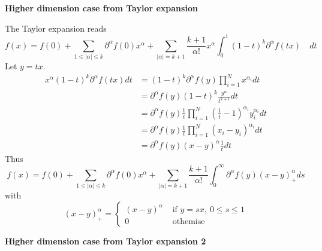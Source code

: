 \noindent\textbf{Higher dimension case from Taylor expansion}

The Taylor expansion reads
\begin{equation}
f(x)=f(0)+\sum_{1\le |\alpha| \leqslant k} \partial^\alpha f(0) x^{\alpha}+\sum_{|\alpha|=k+1} \frac{k+1}{\alpha !} x^{\alpha} \int_{0}^{1}(1-t)^{k} \partial^\alpha f(t x) \quad d t
\end{equation}
Let $y=tx$.
\begin{equation}
\begin{aligned}
x^{\alpha}(1-t)^{k} \partial^{\alpha} f(t x) d t &=(1-t)^{k} \partial^{\alpha} f(y) \prod_{i=1}^{N} x^{\alpha_{i}} d t\\
&=\partial^{\alpha} f(y) (1-t)^{k} \frac{y^{\alpha}}{t^{k+1}} d t \\
&=\partial^{\alpha} f(y)  \frac{1}{t} \prod_{i=1}^{N}\left(\frac{1}{t}-1\right)^{\alpha_{i}} y_{i}^{\alpha_{i}} d t \\
&=\partial^{\alpha} f(y)  \frac{1}{t} \prod_{i=1}^{N}\left(x_{i}-y_{i}\right)^{\alpha_{i}} d t \\
&=\partial^{\alpha} f(y)  (x-y)^{\alpha} \frac{1}{t} d t
\end{aligned}
\end{equation}
Thus 
\begin{equation}
f(x)=f(0)+\sum_{1\le |\alpha| \leqslant k} \partial^\alpha f(0) x^{\alpha}+\sum_{|\alpha|=k+1} \frac{k+1}{\alpha !}  \int_{0}^{\infty} \partial^\alpha f(y) (x-y)_+^\alpha  d s
\end{equation}
with 
\begin{equation}
(x-y)_{+}^{\alpha}=\left\{\begin{array}{ccc}
(x-y)^{\alpha} & \text { if }  
y=sx,\ 0\le s \le 1 
\\
0 &  \text { othemise } 
\end{array}\right.
\end{equation}


\noindent\textbf{Higher dimension case from Taylor expansion 2}









